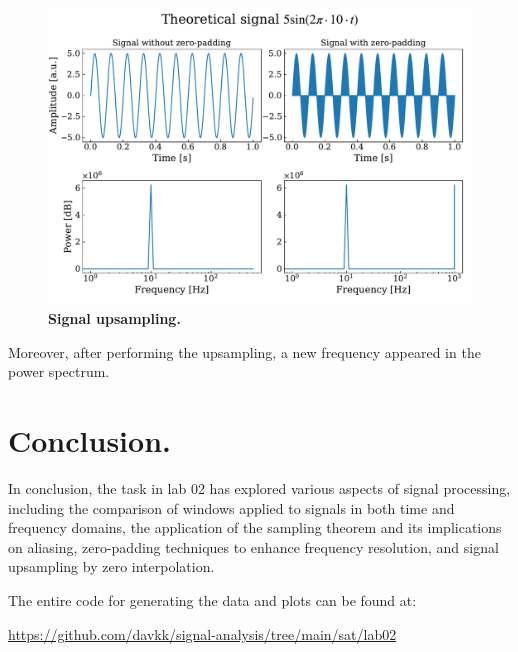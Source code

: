 \documentclass[13pt,a4paper]{article}
\begin{document}
\begin{figure}[ht!]
    \centering
    \includegraphics[width=\linewidth]{upsampling.pdf}
    \caption{\textbf{Signal upsampling.}}
    \label{fig:upsampling}
\end{figure}

Moreover, after performing the upsampling, a new frequency appeared in the power spectrum.


\section{Conclusion.}

In conclusion, the task in lab 02 has explored various aspects of signal processing, including the comparison of windows applied to signals in both time and frequency domains, the application of the sampling theorem and its implications on aliasing, zero-padding techniques to enhance frequency resolution, and signal upsampling by zero interpolation.

The entire code for generating the data and plots can be found at:

\url{https://github.com/davkk/signal-analysis/tree/main/sat/lab02}
\end{document}
